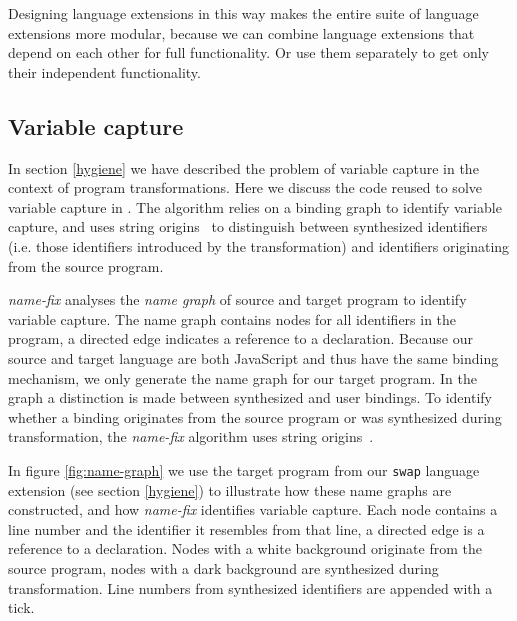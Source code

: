Designing language extensions in this way makes the entire suite of language extensions more modular, because we can combine language extensions that depend on each other for full functionality. Or use them separately to get only their independent functionality.

\subsection{Variable capture}
In section \ref{hygiene} we have described the problem of variable capture in the context of program transformations. 
Here we discuss the code reused to solve variable capture in \projectname. The algorithm relies on a binding graph to identify variable capture, and uses string origins~\cite{Inostroza2014} to distinguish between synthesized identifiers (i.e. those identifiers introduced by the transformation) and identifiers originating from the source program.

\textit{name-fix} analyses the \textit{name graph} of source and target program to identify variable capture. The name graph contains nodes for all identifiers in the program, a directed edge indicates a reference to a declaration. Because our source and target language are both JavaScript and thus have the same binding mechanism, we only generate the name graph for our target program. In the graph a distinction is made between synthesized and user bindings. To identify whether a binding originates from the source program or was synthesized during transformation, the \textit{name-fix} algorithm uses string origins~\cite{Inostroza2014}.

In figure \ref{fig:name-graph} we use the target program from our \lstinline$swap$ language extension (see section \ref{hygiene}) to illustrate how these name graphs are constructed, and how \textit{name-fix} identifies variable capture. Each node contains a line number and the identifier it resembles from that line, a directed edge is a reference to a declaration. Nodes with a white background originate from the source program, nodes with a dark background are synthesized during transformation. Line numbers from synthesized identifiers are appended with a tick.

